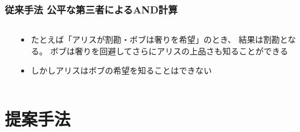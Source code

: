 \begin{frame}
  \frametitle{従来手法 公平な第三者によるAND計算}

  \begin{columns}
    \begin{column}{0.6\textwidth}

    \end{column}
    \begin{column}{0.4\textwidth}
      \begin{itemize}
        \item たとえば「アリスが割勘・ボブは奢りを希望」のとき、
        結果は割勘となる。
        ボブは奢りを回避してさらにアリスの上品さも知ることができる

        \item しかしアリスはボブの希望を知ることはできない
      \end{itemize}
    \end{column}
  \end{columns}
\end{frame}

\section{提案手法}

